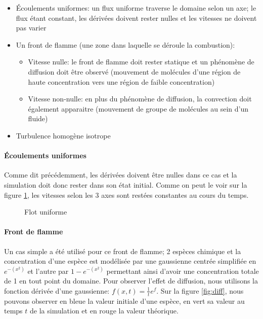 \begin{itemize}
\item Écoulements uniformes: un flux uniforme traverse le domaine selon un axe; le flux étant constant, les dérivées doivent rester nulles et les vitesses ne doivent pas varier
\item Un front de flamme (une zone dans laquelle se déroule la combustion):
  \begin{itemize}
  \item Vitesse nulle: le front de flamme doit rester statique et un phénomène de diffusion doit être observé (mouvement de molécules d'une région de haute concentration vers une région de faible concentration)
  \item Vitesse non-nulle: en plus du phénomène de diffusion, la convection doit également apparaitre (mouvement de groupe de molécules au sein d'un fluide)
  \end{itemize}
\item Turbulence homogène isotrope
\end{itemize}

\paragraph{Écoulements uniformes}
Comme dit précédemment, les dérivées doivent être nulles dans ce cas et la simulation doit donc rester dans son état initial. Comme on peut le voir sur la figure \ref{fig:uniform_flow}, les vitesses selon les 3 axes sont restées constantes au cours du temps.
 
\begin{figure}[ht]
  \centering
  \caption{\label{fig:uniform_flow}Flot uniforme}
\end{figure}

\paragraph{Front de flamme}
Un cas simple a été utilisé pour ce front de flamme; 2 espèces chimique et la concentration d'une espèce est modélisée par une gaussienne centrée simplifiée en $e^{-(x^2)}$ et l'autre par $1-e^{-(x^2)}$ permettant ainsi d'avoir une concentration totale de 1 en tout point du domaine. Pour observer l'effet de diffusion, nous utilisons la fonction dérivée d'une gaussienne: $f(x,t)=\frac{1}{t}e^{f}$. Sur la figure \ref{fig:diff}, nous pouvons observer en bleue la valeur initiale d'une espèce, en vert sa valeur au temps $t$ de la simulation et en rouge la valeur théorique.

